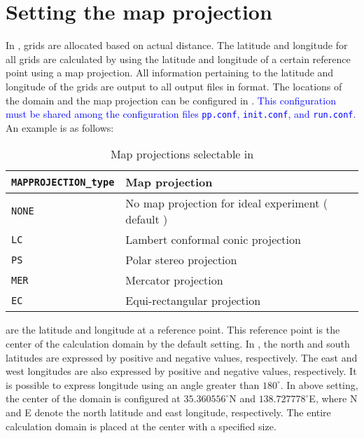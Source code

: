 \section{Setting the map projection} \label{subsec:adv_mapproj}

In \scalerm, grids are allocated based on actual distance. The latitude and longitude for all grids are calculated by using the latitude and longitude of a certain reference point using a map projection. All information pertaining to the latitude and longitude of the grids are output to all output files in \netcdf format. The locations of the domain and the map projection can be configured in . \textcolor{blue}{This configuration must be shared among the configuration files \texttt{pp.conf}, \texttt{init.conf}, and \texttt{run.conf}.} An example is as follows:

\begin{table}[tb]
\begin{center}
\caption{Map projections selectable in \scalerm}
\begin{tabularx}{150mm}{|l|X|} \hline
 \rowcolor[gray]{0.9} \verb|MAPPROJECTION_type| & Map projection\\ \hline
 \verb|NONE| & No map projection for ideal experiment ( default ) \\ \hline
 \verb|LC|   & Lambert conformal conic projection   \\ \hline
 \verb|PS|   & Polar stereo projection           \\ \hline
 \verb|MER|  & Mercator projection               \\ \hline
 \verb|EC|   & Equi-rectangular projection        \\ \hline
\end{tabularx}
\label{tab:map_proj}
\end{center}
\end{table}

 are the latitude and longitude at a reference point. This reference point is the center of the calculation domain by the default setting.
In \scalerm, the north and south latitudes are expressed by positive and negative values, respectively. The east and west longitudes are also expressed by positive and negative values, respectively. It is possible to express longitude using an angle greater than $180^{\circ}$.
In above setting, the center of the domain is configured at $35.360556^{\circ}$N and $138.727778^{\circ}$E, where N and E denote the north latitude and east longitude, respectively. The entire calculation domain is placed at the center with a specified size.

